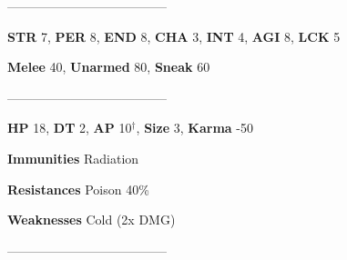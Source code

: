 \documentclass[11pt,a4paper,twocolumn]{book}
\begin{document}
	--------------------------------------

	\noindent
	\textbf{STR} 7, \textbf{PER} 8, \textbf{END} 8, \textbf{CHA} 3, \textbf{INT} 4, \textbf{AGI} 8, \textbf{LCK} 5
	
	\noindent
	\textbf{Melee} 40, \textbf{Unarmed} 80, \textbf{Sneak} 60
	
	--------------------------------------
	
	\noindent
	\textbf{HP} 18, \textbf{DT} 2, \textbf{AP} 10$^{\dag}$, \textbf{Size} 3, \textbf{Karma} -50
	
	
	\noindent
	\textbf{Immunities} Radiation%
	
	\noindent
	\textbf{Resistances} Poison 40\%%
	
	\noindent
	\textbf{Weaknesses} Cold (2x DMG) %
	
	--------------------------------------
	
\end{document}

